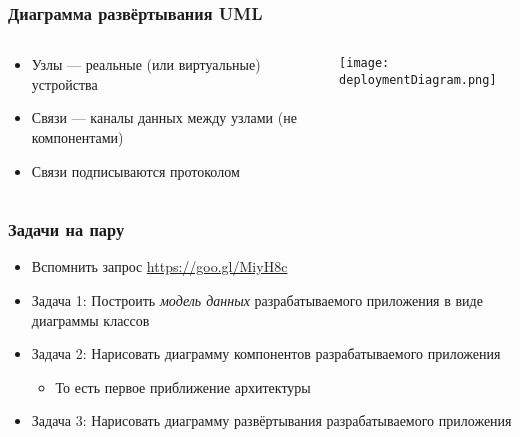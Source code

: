 \documentclass{../../slides-style}
\begin{document}
    \begin{frame}
        \frametitle{Диаграмма развёртывания UML}
        \begin{columns}
            \begin{column}{0.5\textwidth}
                \begin{itemize}
                    \item Узлы --- реальные (или виртуальные) устройства
                    \item Связи --- каналы данных между узлами (не компонентами)
                    \item Связи подписываются протоколом
                \end{itemize}
            \end{column}
            \begin{column}{0.5\textwidth}
                \begin{center}
                    \texttt{[image: deploymentDiagram.png]}
                \end{center}
            \end{column}
        \end{columns}
    \end{frame}

    \begin{frame}
        \frametitle{Задачи на пару}
        \begin{itemize}
            \item Вспомнить запрос \url{https://goo.gl/MiyH8c}
            \item Задача 1: Построить \textit{модель данных} разрабатываемого приложения в виде диаграммы классов
            \item Задача 2: Нарисовать диаграмму компонентов разрабатываемого приложения
            \begin{itemize}
                \item То есть первое приближение архитектуры
            \end{itemize}
            \item Задача 3: Нарисовать диаграмму развёртывания разрабатываемого приложения
        \end{itemize}
    \end{frame}
\end{document}
